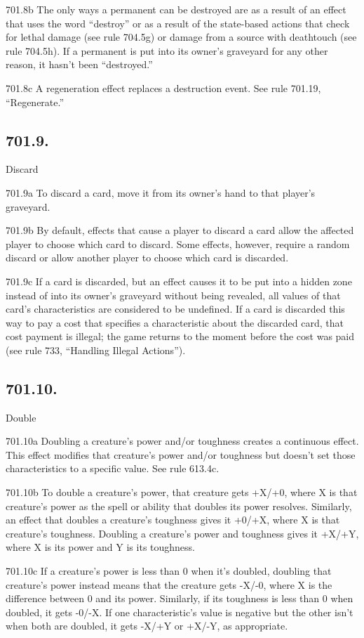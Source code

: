 701.8b The only ways a permanent can be destroyed are as a result of an effect that uses the word “destroy” or as a result of the state-based actions that check for lethal damage (see rule 704.5g) or damage from a source with deathtouch (see rule 704.5h). If a permanent is put into its owner’s graveyard for any other reason, it hasn’t been “destroyed.”

701.8c A regeneration effect replaces a destruction event. See rule 701.19, “Regenerate.”

\subsection*{701.9.}
Discard

701.9a To discard a card, move it from its owner’s hand to that player’s graveyard.

701.9b By default, effects that cause a player to discard a card allow the affected player to choose which card to discard. Some effects, however, require a random discard or allow another player to choose which card is discarded.

701.9c If a card is discarded, but an effect causes it to be put into a hidden zone instead of into its owner’s graveyard without being revealed, all values of that card’s characteristics are considered to be undefined. If a card is discarded this way to pay a cost that specifies a characteristic about the discarded card, that cost payment is illegal; the game returns to the moment before the cost was paid (see rule 733, “Handling Illegal Actions”).

\subsection*{701.10.}
Double

701.10a Doubling a creature’s power and/or toughness creates a continuous effect. This effect modifies that creature’s power and/or toughness but doesn’t set those characteristics to a specific value. See rule 613.4c.

701.10b To double a creature’s power, that creature gets +X/+0, where X is that creature’s power as the spell or ability that doubles its power resolves. Similarly, an effect that doubles a creature’s toughness gives it +0/+X, where X is that creature’s toughness. Doubling a creature’s power and toughness gives it +X/+Y, where X is its power and Y is its toughness.

701.10c If a creature’s power is less than 0 when it’s doubled, doubling that creature’s power instead means that the creature gets -X/-0, where X is the difference between 0 and its power. Similarly, if its toughness is less than 0 when doubled, it gets -0/-X. If one characteristic’s value is negative but the other isn’t when both are doubled, it gets -X/+Y or +X/-Y, as appropriate.


